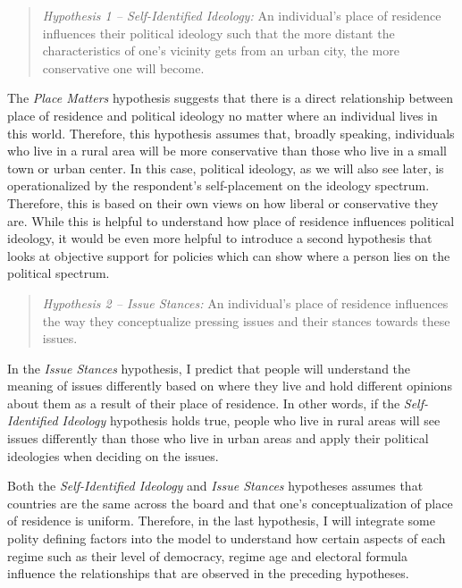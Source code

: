 \documentclass[12pt, titlepage]{article}
\newcommand\e{\emph}
\begin{document}
\begin{quote}
	\e {Hypothesis 1 -- Self-Identified Ideology:} An individual's place of residence influences their political ideology such that the more distant the characteristics of one's vicinity gets from an urban city, the more conservative one will become.
\end{quote}

The \e{Place Matters} hypothesis suggests that there is a direct relationship between place of residence and political ideology no matter where an individual lives in this world. Therefore, this hypothesis assumes that, broadly speaking, individuals who live in a rural area will be more conservative than those who live in a small town or urban center. In this case, political ideology, as we will also see later, is operationalized by the respondent's self-placement on the ideology spectrum. Therefore, this is based on their own views on how liberal or conservative they are. While this is helpful to understand how place of residence influences political ideology, it would be even more helpful to introduce a second hypothesis that looks at objective support for policies which can show where a person lies on the political spectrum.

\begin{quote}
	\e{Hypothesis 2 -- Issue Stances:} An individual's place of residence influences the way they conceptualize pressing issues and their stances towards these issues.
\end{quote}

In the \e{Issue Stances} hypothesis, I predict that people will understand the meaning of issues differently based on where they live and hold different opinions about them as a result of their place of residence. In other words, if the \e{Self-Identified Ideology} hypothesis holds true, people who live in rural areas will see issues differently than those who live in urban areas and apply their political ideologies when deciding on the issues. 

Both the \e{Self-Identified Ideology} and \e{Issue Stances} hypotheses assumes that countries are the same across the board and that one's conceptualization of place of residence is uniform. Therefore, in the last hypothesis, I will integrate some polity defining factors into the model to understand how certain aspects of each regime such as their level of democracy, regime age and electoral formula influence the relationships that are observed in the preceding hypotheses. 
\end{document}
